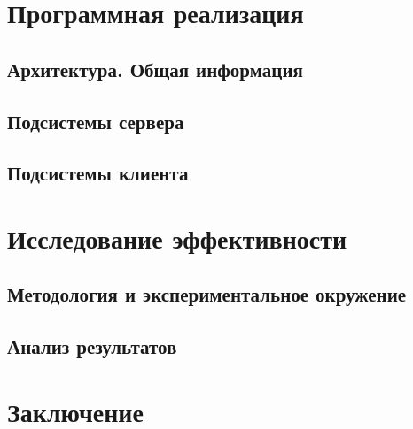 \documentclass{disser}
\begin{document}
\section{Программная реализация}
\subsection{Архитектура. Общая информация}

\subsection{Подсистемы сервера}

\subsection{Подсистемы клиента}

\section{Исследование эффективности}
\subsection{Методология и экспериментальное окружение}

\subsection{Анализ результатов}

\section*{Заключение}
\end{document}
